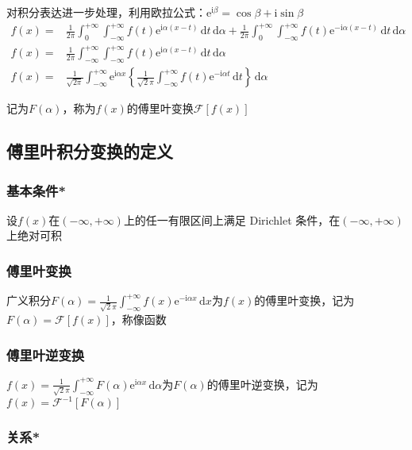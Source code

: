 对积分表达进一步处理，利用欧拉公式：\(\mathrm{e}^{\mathrm{i}\beta}=\cos\beta+\mathrm{i}\sin\beta\)
\begin{align*}
f(x)=&\frac{1}{2\pi}\int_{0}^{+\infty}\int_{-\infty}^{+\infty} f(t)\mathrm{e}^{\mathrm{i}\alpha(x-t)}\,\mathrm{d}t\,\mathrm{d}\alpha+\frac{1}{2\pi}\int_{0}^{+\infty}\int_{-\infty}^{+\infty} f(t)\mathrm{e}^{-\mathrm{i}\alpha(x-t)}\,\mathrm{d}t\,\mathrm{d}\alpha\\
f(x)=&\frac{1}{2\pi}\int_{-\infty}^{+\infty}\int_{-\infty}^{+\infty} f(t)\mathrm{e}^{\mathrm{i}\alpha\left(x-t\right)}\,\mathrm{d}t\,\mathrm{d}\alpha\\
f(x)=&\frac{1}{\sqrt{2\pi}}\int_{-\infty}^{+\infty}{\mathrm{e}^{\mathrm{i}\alpha x}\left\{\frac{1}{\sqrt{2}\pi}\int_{-\infty}^{+\infty}{f(t)\mathrm{e}^{-{\mathrm{i}\alpha t}}\,\mathrm{d}t}\right\}\,\mathrm{d}\alpha}
\end{align*}

记为\(F(\alpha)\)，称为\(f(x)\)的傅里叶变换\(\mathscr{F}[f(x)]\)

\subsection{傅里叶积分变换的定义}

\subsubsection{基本条件*}

设\(f(x)\)在\((-\infty,+\infty)\)上的任一有限区间上满足 Dirichlet 条件，在\((-\infty,+\infty)\)上绝对可积
\subsubsection{傅里叶变换}

广义积分\(F(\alpha)=\frac{1}{\sqrt{2}\pi}\int_{-\infty}^{+\infty}f(x)\mathrm{e}^{-{\mathrm{i}\alpha x}}\,\mathrm{d}x\)为\(f(x)\)的傅里叶变换，记为\(F(\alpha)=\mathscr{F}[f(x)]\)，称像函数

\subsubsection{傅里叶逆变换}
\(f(x)=\frac{1}{\sqrt{2}\pi}\int_{-\infty}^{+\infty}{F(\alpha)\mathrm{e}^{\mathrm{i}\alpha x}\,\mathrm{d}\alpha}\)为\(F(\alpha)\)的傅里叶逆变换，记为\(f(x)=\mathscr{F}^{-1}[F(\alpha)]\)

\subsubsection{关系*}

